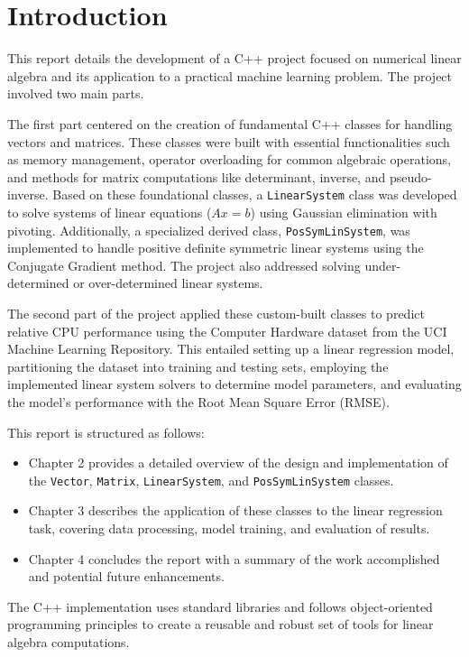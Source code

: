 \chapter{Introduction}
\label{chap:introduction}

This report details the development of a C++ project focused on numerical linear algebra and its application to a practical machine learning problem. The project involved two main parts.

The first part centered on the creation of fundamental C++ classes for handling vectors and matrices. These classes were built with essential functionalities such as memory management, operator overloading for common algebraic operations, and methods for matrix computations like determinant, inverse, and pseudo-inverse. Based on these foundational classes, a \texttt{LinearSystem} class was developed to solve systems of linear equations ($Ax=b$) using Gaussian elimination with pivoting. Additionally, a specialized derived class, \texttt{PosSymLinSystem}, was implemented to handle positive definite symmetric linear systems using the Conjugate Gradient method. The project also addressed solving under-determined or over-determined linear systems.

The second part of the project applied these custom-built classes to predict relative CPU performance using the Computer Hardware dataset from the UCI Machine Learning Repository. This entailed setting up a linear regression model, partitioning the dataset into training and testing sets, employing the implemented linear system solvers to determine model parameters, and evaluating the model's performance with the Root Mean Square Error (RMSE).

This report is structured as follows:

\begin{itemize}
    \item Chapter 2 provides a detailed overview of the design and implementation of the \texttt{Vector}, \texttt{Matrix}, \texttt{LinearSystem}, and \texttt{PosSymLinSystem} classes.
    \item Chapter 3 describes the application of these classes to the linear regression task, covering data processing, model training, and evaluation of results.
    \item Chapter 4 concludes the report with a summary of the work accomplished and potential future enhancements.
\end{itemize}

The C++ implementation uses standard libraries and follows object-oriented programming principles to create a reusable and robust set of tools for linear algebra computations.